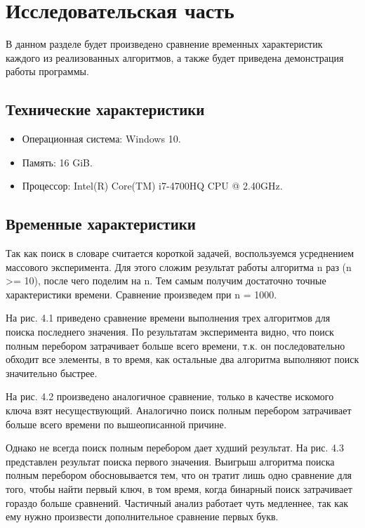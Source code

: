 \chapter{Исследовательская часть}

В данном разделе будет произведено сравнение временных характеристик каждого из реализованных алгоритмов, а также будет приведена демонстрация работы программы.



\section{Технические характеристики}

\begin{itemize}
	\item Операционная система: Windows 10. \cite{windows}
	\item Память: 16 GiB.
	\item Процессор: Intel(R) Core(TM) i7-4700HQ CPU @ 2.40GHz. \cite{intel}
\end{itemize}


\section{Временные характеристики}

Так как поиск в словаре считается короткой задачей, воспользуемся усреднением массо­вого эксперимента.
Для этого сложим результат работы алгоритма n раз (n >= 10), после чего поделим на n.
Тем самым получим достаточно точные характеристики времени.
Сравнение произведем при n = 1000.

На рис. 4.1 приведено сравнение времени выполнения
трех алгоритмов для поиска последнего значения.
По результатам эксперимента видно, что поиск полным перебором
затрачивает больше всего времени, т.к. он последовательно обходит
все элементы, в то время, как остальные два алгоритма выполняют
поиск значительно быстрее.



На рис. 4.2 произведено аналогичное сравнение, только в качестве искомого ключа
взят несуществующий. Аналогично поиск полным перебором
затрачивает больше всего времени по вышеописанной причине.



Однако не всегда поиск полным перебором дает худший результат.
На рис. 4.3 представлен результат поиска первого значения.
Выигрыш алгоритма поиска полным перебором обосновывается тем, что он тратит
лишь одно сравнение для того, чтобы найти первый ключ, в том время, когда
бинарный поиск затрачивает гораздо больше сравнений.
Частичный анализ работает чуть медленнее, так как ему нужно
произвести дополнительное сравнение первых букв.

